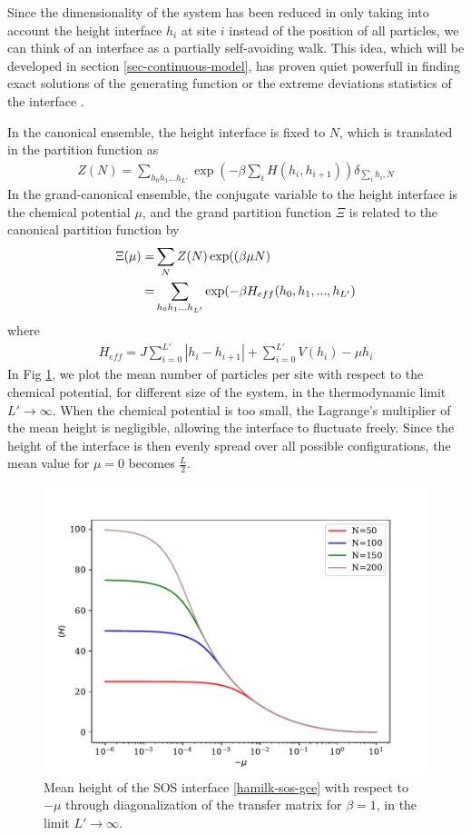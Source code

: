 Since the dimensionality of the system has been reduced in only taking into account the height interface $h_i$ at site $i$ instead of the position of all particles, we can think of an interface as a partially self-avoiding walk. This idea, which will be developed in section \ref{sec-continuous-model}, has proven quiet powerfull in finding exact solutions of the generating function \cite{owczarek_exact_1993} or the extreme deviations statistics of the interface \cite{majumdar_airy_2005,schehr_universal_2006}.

In the canonical ensemble, the height interface is fixed to $N$, which is translated in the partition function as
\begin{align}
Z(N) = \sum_{h_0 h_1 ... h_{L'}} \exp(- \beta \sum_{i} H(h_i,h_{i+1})) \delta_{\sum_i h_i, N}
\label{hamil-sos-cano}
\end{align}
In the grand-canonical ensemble, the conjugate variable to the height interface is the chemical potential $\mu$, and the grand partition function $\Xi$ is related to the canonical partition function by
\begin{align}
\Xi(\mu) =& \sum_N Z(N) \exp((\beta \mu N) \nonumber \\
=& \sum_{h_0 h_1 ... h_{L'}} \exp(-\beta H_{eff}(h_0,h_1,...,h_{L'})
\label{hamilk-sos-gce}
\end{align}
where
\begin{align}
H_{eff} = J \sum_{i=0}^{L'} |h_i-h_{i+1}|+ \sum_{i=0}^{L'} V(h_i)-\mu h_i
\end{align}
In Fig \ref{hauteur-mu}, we plot the mean number of particles per site with respect to the chemical potential, for different size of the system, in the thermodynamic limit $L' \to \infty$. When the chemical potential is too small, the Lagrange's multiplier of the mean height is negligible, allowing the interface to fluctuate freely. Since the height of the interface is then evenly spread over all possible configurations, the mean value for $\mu=0$ becomes $\frac{L}{2}$.


\begin{figure}
\centering
\includegraphics[width=0.7\linewidth]{int-dyn/hauteur-tm-sos.pdf}
\caption{Mean height of the SOS interface \eqref{hamilk-sos-gce} with respect to $- \mu$ through diagonalization of the transfer matrix for $\beta=1$, in the limit $L'\to \infty$. }
\label{hauteur-mu}
\end{figure}

